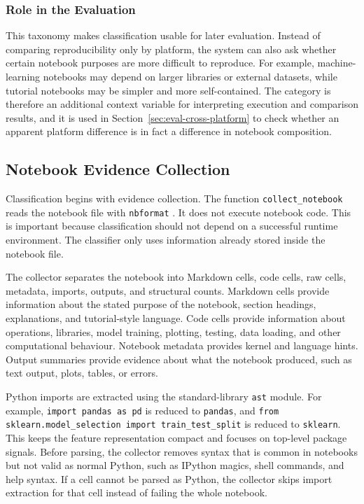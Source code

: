 \subsubsection*{Role in the Evaluation}

This taxonomy makes classification usable for later evaluation. Instead of comparing reproducibility only by platform, the system can also ask whether certain notebook purposes are more difficult to reproduce. For example, machine-learning notebooks may depend on larger libraries or external datasets, while tutorial notebooks may be simpler and more self-contained. The category is therefore an additional context variable for interpreting execution and comparison results, and it is used in Section~\ref{sec:eval-cross-platform} to check whether an apparent platform difference is in fact a difference in notebook composition.

\subsection{Notebook Evidence Collection}

Classification begins with evidence collection. The function \texttt{collect\_notebook} reads the notebook file with \texttt{nbformat} \cite{nbformat}. It does not execute notebook code. This is important because classification should not depend on a successful runtime environment. The classifier only uses information already stored inside the notebook file.

The collector separates the notebook into Markdown cells, code cells, raw cells, metadata, imports, outputs, and structural counts. Markdown cells provide information about the stated purpose of the notebook, section headings, explanations, and tutorial-style language. Code cells provide information about operations, libraries, model training, plotting, testing, data loading, and other computational behaviour. Notebook metadata provides kernel and language hints. Output summaries provide evidence about what the notebook produced, such as text output, plots, tables, or errors.

Python imports are extracted using the standard-library \texttt{ast} module. For example, \texttt{import pandas as pd} is reduced to \texttt{pandas}, and \texttt{from sklearn.model\_selection import train\_test\_split} is reduced to \texttt{sklearn}. This keeps the feature representation compact and focuses on top-level package signals. Before parsing, the collector removes syntax that is common in notebooks but not valid as normal Python, such as IPython magics, shell commands, and help syntax. If a cell cannot be parsed as Python, the collector skips import extraction for that cell instead of failing the whole notebook.


